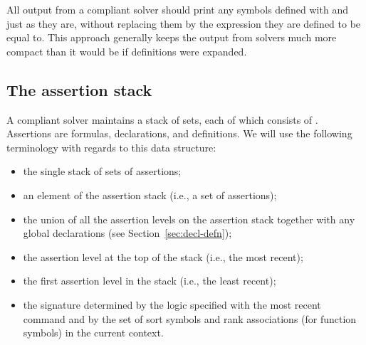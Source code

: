 All output from a compliant solver should print any symbols
defined with  and  just as they are, 
without replacing them by the expression they are defined to be equal to.  
This approach generally keeps the output from solvers much more compact than 
it would be if definitions were expanded.

%



\subsection{The assertion stack} \label{sec:assert-stack}

A compliant solver maintains a stack of sets, 
each of which consists of .
Assertions are formulas, declarations, and definitions.
We will use the following terminology with regards to this data structure:
\begin{itemize}
\item 
{} the single stack of sets of assertions;
\item 
{} an element of the assertion stack 
(i.e., a set of assertions);
\item 
{} the union of all the assertion levels on the assertion stack
together with any global declarations (see Section~\ref{sec:decl-defn});
\item 
{} the assertion level at the top of the stack 
(i.e., the most recent);
\item {} the first assertion level in the stack
(i.e., the least recent);
\item {} the signature determined by the logic
  specified with the most recent  command and
by the set of sort symbols and rank associations (for function symbols) 
in the current context.  
\end{itemize}

